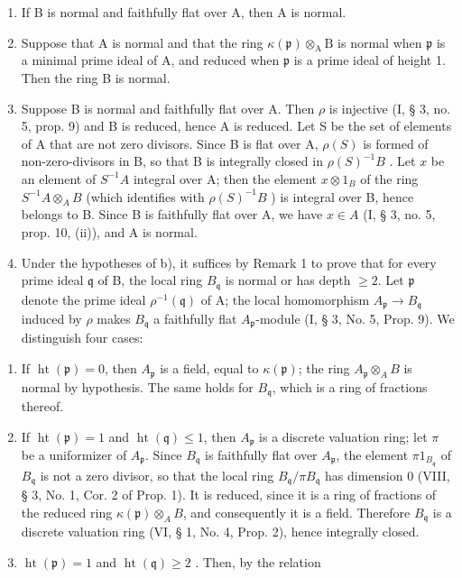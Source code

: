 \begin{enumerate}
\def\labelenumi{\alph{enumi})}
\item
  If B is normal and faithfully flat over A, then A is normal.
\item
  Suppose that A is normal and that the ring \(\kappa(\mathfrak{p})\otimes_{\mathrm{A}}\mathrm{B}\) is normal when \(\mathfrak{p}\) is a minimal prime ideal of A, and reduced when \(\mathfrak{p}\) is a prime ideal of height 1. Then the ring B is normal.
\item
  Suppose B is normal and faithfully flat over A. Then \(\rho\) is injective (I, § 3, no. 5, prop. 9) and B is reduced, hence A is reduced. Let S be the set of elements of A that are not zero divisors. Since B is flat over A, \(\rho(S)\) is formed of non-zero-divisors in B, so that B is integrally closed in \(\rho(S)^{-1}B\) . Let \(x\) be an element of \(S^{-1}A\) integral over A; then the element \(x \otimes 1_B\) of the ring \(S^{-1}A \otimes_A B\) (which identifies with \(\rho(S)^{-1}B\) ) is integral over B, hence belongs to B. Since B is faithfully flat over A, we have \(x \in A\) (I, § 3, no. 5, prop. 10, (ii)), and A is normal.
\item
  Under the hypotheses of b), it suffices by Remark 1 to prove that for every prime ideal \(\mathfrak{q}\) of B, the local ring \(B_{\mathfrak{q}}\) is normal or has depth \(\geqslant 2\). Let \(\mathfrak{p}\) denote the prime ideal \(\rho^{-1}(\mathfrak{q})\) of A; the local homomorphism \(A_{\mathfrak{p}} \to B_{\mathfrak{q}}\) induced by \(\rho\) makes \(B_{\mathfrak{q}}\) a faithfully flat \(A_{\mathfrak{p}}\)-module (I, § 3, No. 5, Prop. 9). We distinguish four cases:
\end{enumerate}

\begin{enumerate}
\def\labelenumi{\arabic{enumi})}
\item
  If \(\operatorname{ht}(\mathfrak{p}) = 0\), then \(A_{\mathfrak{p}}\) is a field, equal to \(\kappa(\mathfrak{p})\); the ring \(A_{\mathfrak{p}} \otimes_{A} B\) is normal by hypothesis. The same holds for \(B_{\mathfrak{q}}\), which is a ring of fractions thereof.
\item
  If \(\operatorname{ht}(\mathfrak{p}) = 1\) and \(\operatorname{ht}(\mathfrak{q}) \leqslant 1\), then \(A_{\mathfrak{p}}\) is a discrete valuation ring; let \(\pi\) be a uniformizer of \(A_{\mathfrak{p}}\). Since \(B_{\mathfrak{q}}\) is faithfully flat over \(A_{\mathfrak{p}}\), the element \(\pi 1_{B_{\mathfrak{q}}}\) of \(B_{\mathfrak{q}}\) is not a zero divisor, so that the local ring \(B_{\mathfrak{q}}/\pi B_{\mathfrak{q}}\) has dimension 0 (VIII, § 3, No. 1, Cor. 2 of Prop. 1). It is reduced, since it is a ring of fractions of the reduced ring \(\kappa(\mathfrak{p}) \otimes_{A} B\), and consequently it is a field. Therefore \(B_{\mathfrak{q}}\) is a discrete valuation ring (VI, § 1, No. 4, Prop. 2), hence integrally closed.
\item
  \(\operatorname{ht}(\mathfrak{p}) = 1\) and \(\operatorname{ht}(\mathfrak{q}) \geqslant 2\) . Then, by the relation
\end{enumerate}

